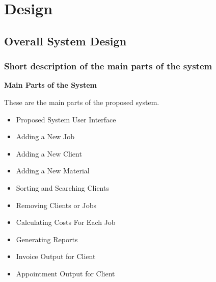 \chapter{Design}

\section{Overall System Design}

\subsection{Short description of the main parts of the system}

\begin{flushleft}
\textbf{Main Parts of the System}
 \\ \par These are the main parts of the proposed system.
	\begin{itemize}
			\item Proposed System User Interface
			\item Adding a New Job
			\item Adding a New Client
			\item Adding a New Material
			\item Sorting and Searching Clients
			\item Removing Clients or Jobs
			\item Calculating Costs For Each Job
			\item Generating Reports
			\item Invoice Output for Client
			\item Appointment Output for Client
	\end{itemize}

\end{flushleft}


